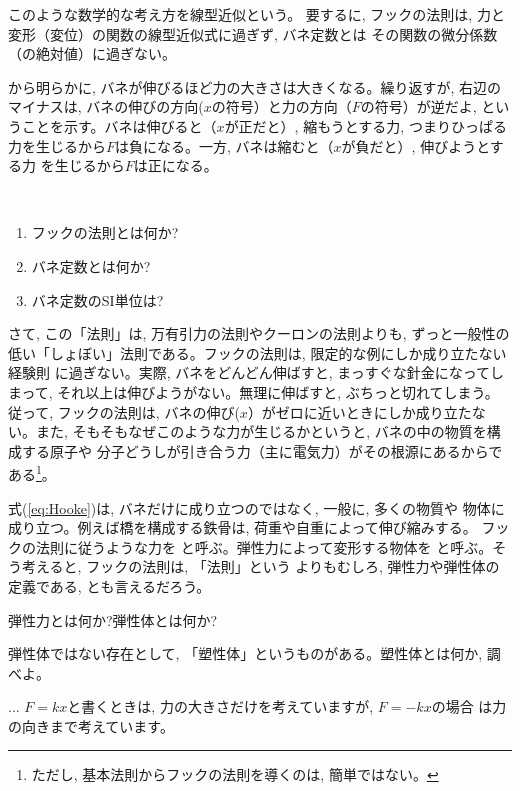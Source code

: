このような数学的な考え方を線型近似という。
要するに, フックの法則は, 力と変形（変位）の関数の線型近似式に過ぎず, バネ定数とは
その関数の微分係数（の絶対値）に過ぎない。

から明らかに, バネが伸びるほど力の大きさは大きくなる。繰り返すが, 
右辺のマイナスは, バネの伸びの方向($x$の符号）と力の方向（$F$の符号）が逆だよ, 
ということを示す。バネは伸びると（$x$が正だと）, 縮もうとする力, つまりひっぱる
力を生じるから$F$は負になる。一方, バネは縮むと（$x$が負だと）, 伸びようとする力
を生じるから$F$は正になる。

\begin{q}\label{q:Hooke_law}　
\begin{enumerate}
\item フックの法則とは何か?
\item バネ定数とは何か?
\item バネ定数のSI単位は?
\end{enumerate}
\end{q}
\mv

さて, この「法則」は, 万有引力の法則やクーロンの法則よりも, ずっと一般性の
低い「しょぼい」法則である。フックの法則は, 限定的な例にしか成り立たない経験則
に過ぎない。実際, バネをどんどん伸ばすと, まっすぐな針金になってしまって, 
それ以上は伸びようがない。無理に伸ばすと, ぶちっと切れてしまう。従って, 
フックの法則は, バネの伸び($x$）がゼロに近いときにしか成り立たない。また, 
そもそもなぜこのような力が生じるかというと, バネの中の物質を構成する原子や
分子どうしが引き合う力（主に電気力）がその根源にあるからである\footnote{ただし, 
基本法則からフックの法則を導くのは, 簡単ではない。}。

式(\ref{eq:Hooke})は, バネだけに成り立つのではなく, 一般に, 多くの物質や
物体に成り立つ。例えば橋を構成する鉄骨は, 荷重や自重によって伸び縮みする。
フックの法則に従うような力を
と呼ぶ。弾性力によって変形する物体を
と呼ぶ。そう考えると, フックの法則は, 「法則」という
よりもむしろ, 弾性力や弾性体の定義である, とも言えるだろう。


\begin{q}\label{q:elasticity}
弾性力とは何か?弾性体とは何か?
\end{q}

\begin{q}\label{q:plasticity}
弾性体ではない存在として, 「塑性体」というものがある。塑性体とは何か, 調べよ。
\end{q}

\begin{faq}{\small{}
... $F=kx$と書くときは, 力の大きさだけを考えていますが, $F=-kx$の場合
は力の向きまで考えています。}\end{faq}\mv

